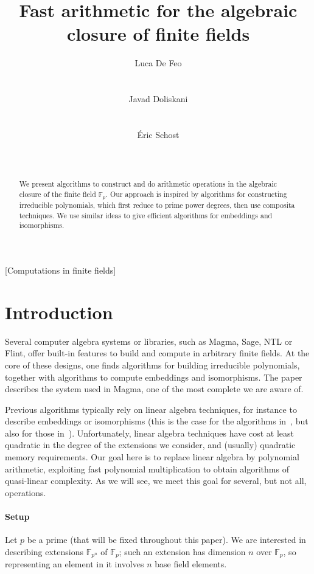 \documentclass{sig-alternate}
\author{
  \alignauthor Luca De Feo\\
  \affaddr{Laboratoire PRiSM}\\
  \affaddr{Universit\'e de Versailles}\\
  \email{luca.de-feo@uvsq.fr}
  \alignauthor Javad Doliskani\\
  \affaddr{Computer Science Department}\\
  \affaddr{Western University}\\
  \email{jdoliska@uwo.ca}
  \alignauthor \'Eric Schost\\
  \affaddr{Computer Science Department}\\
  \affaddr{Western University}\\
  \email{eschost@uwo.ca}
}
\title{Fast arithmetic for the algebraic closure of finite fields}
\def\F {\ensuremath{\mathbb{F}}}
\newcounter{algo}
\begin{document}
\maketitle
\begin{abstract}
  We present algorithms to construct and do arithmetic operations in
  the algebraic closure of the finite field $\mathbb{F}_p$. Our
  approach is inspired by algorithms for constructing irreducible
  polynomials, which first reduce to prime power degrees, then use
  composita techniques. We use similar ideas to give efficient
  algorithms for embeddings and isomorphisms.
\end{abstract}

[Computations in finite fields]


\section{Introduction}

Several computer algebra systems or libraries, such as Magma, Sage,
NTL or Flint, offer built-in features to build and compute in
arbitrary finite fields. At the core of these designs, one finds
algorithms for building irreducible polynomials, together with
algorithms to compute embeddings and isomorphisms. The
paper~\cite{bosma+cannon+steel97} describes the system used in Magma,
one of the most complete we are aware of.

Previous algorithms typically rely on linear algebra techniques, for
instance to describe embeddings or isomorphisms (this is the case for
the algorithms in~\cite{bosma+cannon+steel97}, but also for those
in~\cite{LenstraJr91,Allombert02}). Unfortunately, linear algebra
techniques have cost at least quadratic in the degree of the
extensions we consider, and (usually) quadratic memory requirements.
Our goal here is to replace linear algebra by polynomial arithmetic,
exploiting fast polynomial multiplication to obtain algorithms of
quasi-linear complexity. As we will see, we meet this goal for
several, but not all, operations.

\paragraph*{{\bf \rm Setup}}
Let $p$ be a prime (that will be fixed throughout this paper). We are
interested in describing extensions $\F_{p^n}$ of $\F_p$; such an
extension has dimension $n$ over $\F_p$, so representing an element in
it involves $n$ base field elements.
\end{document}

